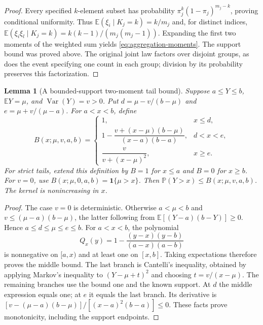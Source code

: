 \documentclass[11pt,letterpaper]{article}
\numberwithin{equation}{section}
\newtheorem{lemma}[theorem]{Lemma}
\theoremstyle{definition}
\theoremstyle{remark}
\newcommand{\E}{\mathbb E}
\newcommand{\Pbb}{\mathbb P}
\DeclareMathOperator{\Var}{Var}
\begin{document}
\begin{proof}
Every specified $k$-element subset has probability
$\pi_j^k(1-\pi_j)^{m_j-k}$, proving conditional uniformity. Thus
$\E(\xi_i\mid K_j=k)=k/m_j$ and, for distinct indices,
$\E(\xi_i\xi_l\mid K_j=k)=k(k-1)/(m_j(m_j-1))$.
Expanding the first two moments of the weighted sum yields
\eqref{eq:aggregation-moments}. The support bound was proved above.
The original joint law factors over disjoint groups, as does the event
specifying one count in each group; division by its probability preserves
this factorization.
\end{proof}


\begin{minipage}{\linewidth}
\begin{lemma}[A bounded-support two-moment tail bound]
\label{lem:aggregation-moment-kernel}
Suppose $a\le Y\le b$, $\E Y=\mu$, and $\Var(Y)=v>0$. Put
$d=\mu-v/(b-\mu)$ and $e=\mu+v/(\mu-a)$. For $a<x<b$, define
\begin{equation}
 B(x;\mu,v,a,b)=
 \begin{cases}
  1,&x\le d,\\[2pt]
  1-\dfrac{v+(x-\mu)(b-\mu)}{(x-a)(b-a)},&d<x<e,\\[7pt]
  \dfrac{v}{v+(x-\mu)^2},&x\ge e.
 \end{cases}
 \label{eq:aggregation-moment-kernel}
\end{equation}
For strict tails, extend this definition by $B=1$ for $x\le a$ and
$B=0$ for $x\ge b$. For $v=0$, use $B(x;\mu,0,a,b)=\mathbf1\{\mu>x\}$.
Then $\Pbb(Y>x)\le B(x;\mu,v,a,b)$. The kernel is nonincreasing
in $x$.
\end{lemma}
\end{minipage}

\begin{proof}
The case $v=0$ is deterministic. Otherwise $a<\mu<b$ and
$v\le(\mu-a)(b-\mu)$, the latter following from
$\E[(Y-a)(b-Y)]\ge0$. Hence $a\le d\le\mu\le e\le b$.
For $a<x<b$, the polynomial
\[
 Q_x(y)=1-\frac{(y-x)(y-b)}{(a-x)(a-b)}
\]
is nonnegative on $[a,x)$ and at least one on $[x,b]$. Taking expectations
therefore proves the middle bound. The last branch is Cantelli's
inequality, obtained by applying Markov's inequality to $(Y-\mu+t)^2$
and choosing $t=v/(x-\mu)$. The remaining branches use the bound one
and the known support. At $d$ the middle expression equals one; at $e$
it equals the last branch. Its derivative is
$[v-(\mu-a)(b-\mu)]/[(x-a)^2(b-a)]\le0$. These facts prove monotonicity, including the support endpoints.
\end{proof}
\end{document}
